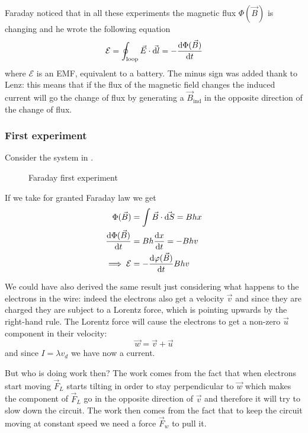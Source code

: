 \documentclass[12pt]{extarticle}
\begin{document}
Faraday noticed that in all these experiments the magnetic flux $\Phi(\vec B)$ is changing
and he wrote the following equation
\begin{equation}
	\mathcal{E} = \oint_\text{loop} \vec E \cdot \vec{\dd l} = - \dv{\Phi(\vec B)}{t}
\end{equation}
where $\mathcal{E}$ is an EMF, equivalent to a battery.
The minus sign was added thank to Lenz: this means that if the flux of the magnetic field changes
the induced current will go  the change of flux
by generating a $\vec B_\text{ind}$ in the opposite direction of the change of flux.

\subsubsection{First experiment}
Consider the system in .

\begin{figure}[H]
	\centering
	
	\caption{Faraday first experiment}
	\label{fig:faraday-exp-1}
\end{figure}

If we take for granted Faraday law we get
\begin{align}
	\Phi(\vec B)         & = \int \vec B \cdot \vec{\dd S} = B h x \\
	\dv{\Phi(\vec B)}{t} & = B h \dv{x}{t} = - B h v               \\
	\implies \mathcal{E} & = - \dv{\varphi(\vec B)}{t} B h v
\end{align}

We could have also derived the same result just considering what happens to the electrons in the wire:
indeed the electrons also get a velocity $\vec v$ and since they are charged they are subject to a Lorentz
force, which is pointing upwards by the right-hand rule.
The Lorentz force will cause the electrons to get a non-zero $\vec u$ component in their velocity:
\begin{equation}
	\vec w = \vec v + \vec u
\end{equation}
and since $I = \lambda v_d$ we have now a current.

But who is doing work then?
The work comes from the fact that when electrons start moving $\vec F_L$ starts tilting in order to stay
perpendicular to $\vec w$ which makes the component of $\vec F_L$ go in the opposite direction of $\vec v$
and therefore it will try to slow down the circuit.
The work then comes from the fact that to keep the circuit moving at constant speed
we need a force $\vec F_w$ to pull it.
\end{document}
